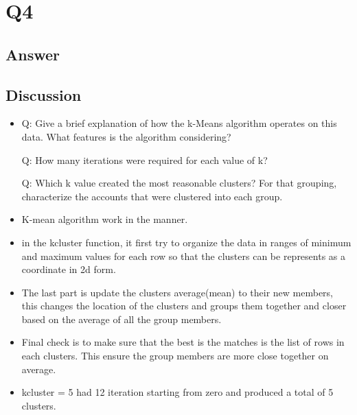 \documentclass[12pt]{article}
\begin{document}
\section*{Q4}

\subsection*{Answer}



\subsection*{Discussion}

\begin{itemize}
\item Q: Give a brief explanation of how the k-Means algorithm operates on this data. What features is the algorithm considering?

Q: How many iterations were required for each value of k?

Q: Which k value created the most reasonable clusters? For that grouping, characterize the accounts that were clustered into each group.

\item K-mean algorithm work in the manner.

\item in the kcluster function, it first try to organize the data in ranges of minimum and maximum values for each row so that the clusters can be represents as a coordinate in 2d form.

\item The last part is update the clusters average(mean) to their new members, this changes the location of the clusters and groups them together and closer based on the average of all the group members.

\item Final check is to make sure that the best is the matches is the list of rows in each clusters. This ensure the group members are more close together on average.

\item kcluster = 5 had 12 iteration starting from zero and produced a total of 5 clusters. 




\end{itemize}
\end{document}
